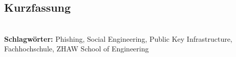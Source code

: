 
\subsection*{Kurzfassung}



%
\mbox{}\\[0.5\baselineskip]\noindent
\textbf{Schlagwörter:} 
Phishing, Social Engineering, Public Key Infrastructure, Fachhochschule, ZHAW School of Engineering







 
 





